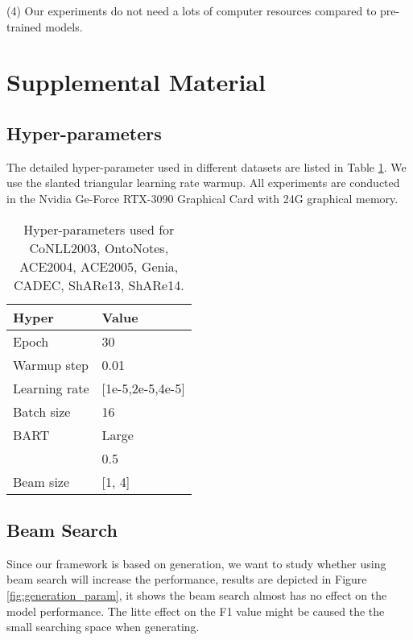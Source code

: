 \documentclass[11pt,a4paper]{article}
\begin{document}
(4) Our experiments do not  need a lots of computer resources compared to pre-trained models.








\clearpage
\appendix
\section{Supplemental Material}

\subsection{Hyper-parameters} \label{supply:random_search}


The detailed hyper-parameter used in different datasets are listed in Table \ref{tb:hyper}. We use the slanted triangular learning rate warmup. All experiments are conducted in the Nvidia Ge-Force RTX-3090 Graphical Card with 24G graphical memory.

\begin{table}[ht]
  \begin{tabular}{l|l}
  \toprule
  Hyper       & Value                                            \\
  \midrule
  Epoch       & 30                                               \\
  Warmup step & 0.01                                             \\
  Learning rate          & [1e-5,2e-5,4e-5] \\
  Batch size  & 16                                               \\
  BART        & Large                                           \\
      & 0.5                                            \\
  Beam size  & [1, 4]  \\
  \bottomrule
  \end{tabular}
  \caption{Hyper-parameters used for CoNLL2003, OntoNotes, ACE2004, ACE2005, Genia, CADEC, ShARe13, ShARe14.}
  \label{tb:hyper}
\end{table}

\subsection{Beam Search}
Since our framework is based on generation, we want to study whether using beam search will increase the performance, results are depicted in Figure \ref{fig:generation_param}, it shows the beam search almost has no effect on the model performance. The litte effect on the F1 value might be caused the the small searching space when generating.
\end{document}
